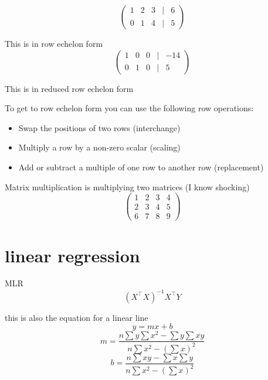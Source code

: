 \documentclass{article}
\begin{document}
$$\begin{pmatrix}
1 & 2 & 3 & | & 6 \\
0 & 1 & 4 & | & 5
\end{pmatrix}$$
\par{This is in row echelon form}
$$\begin{pmatrix}
1 & 0 & 0 & | & -14 \\
0 & 1 & 0 & | & 5
\end{pmatrix}$$

\par{This is in reduced row echelon form}\\
\par{To get to row echelon form you can use the following row operations:}
\begin{itemize}
    \item Swap the positions of two rows (interchange)
    \item Multiply a row by a non-zero scalar (scaling)
    \item Add or subtract a multiple of one row to another row (replacement)
\end{itemize}
\par{Matrix multiplication is multiplying two matrices (I know shocking)}
$$
\begin{pmatrix}
    1 & 2 & 3 & 4\\
    2 & 3 & 4 & 5\\
    6 & 7 & 8 & 9
\end{pmatrix}
$$
\section{linear regression}
\par{MLR}
$$(X^{\top}X)^{-1}X^{\top}Y$$
\par{this is also the equation for a linear line}
$$y = mx+b$$
$$m = \frac{n\sum{y}\sum{x^2}-\sum{y}\sum{xy}}{n\sum{x^2}-(\sum{x})^2}$$
$$b=\frac{n\sum{xy}-\sum{x}\sum{y}}{n\sum{x^2}-(\sum{x})^2}$$
\end{document}
